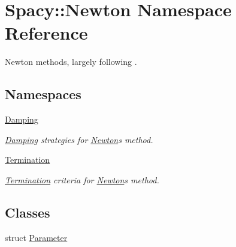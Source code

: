 \hypertarget{namespaceSpacy_1_1Newton}{}\section{Spacy\+:\+:Newton Namespace Reference}
\label{namespaceSpacy_1_1Newton}


Newton methods, largely following \cite{Deuflhard2004}.  


\subsection*{Namespaces}
\begin{DoxyCompactItemize}
\item 
 \hyperlink{namespaceSpacy_1_1Newton_1_1Damping}{Damping}
\begin{DoxyCompactList}\small\item\em \hyperlink{namespaceSpacy_1_1Newton_1_1Damping}{Damping} strategies for \hyperlink{namespaceSpacy_1_1Newton}{Newton}\textquotesingle{}s method. \end{DoxyCompactList}\item 
 \hyperlink{namespaceSpacy_1_1Newton_1_1Termination}{Termination}
\begin{DoxyCompactList}\small\item\em \hyperlink{namespaceSpacy_1_1Newton_1_1Termination}{Termination} criteria for \hyperlink{namespaceSpacy_1_1Newton}{Newton}\textquotesingle{}s method. \end{DoxyCompactList}\end{DoxyCompactItemize}
\subsection*{Classes}
\begin{DoxyCompactItemize}
\item 
struct \hyperlink{structSpacy_1_1Newton_1_1Parameter}{Parameter}
\end{DoxyCompactItemize}
